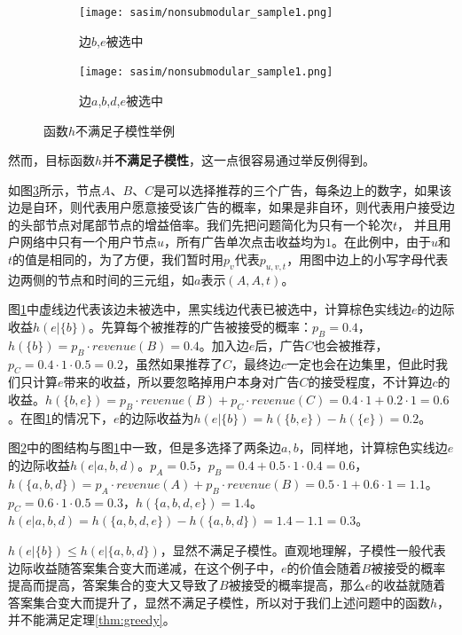 \begin{figure}[htbp]
    \centering
    \begin{subfigure}[t]{0.44\linewidth}
        \centering
        \texttt{[image: sasim/nonsubmodular\_sample1.png]}
        \caption{边$b$,$e$被选中\label{fig:nonsub_a}}
    \end{subfigure}
    \quad
    \begin{subfigure}[t]{0.44\linewidth}
        \centering
        \texttt{[image: sasim/nonsubmodular\_sample1.png]}
        \caption{边$a$,$b$,$d$,$e$被选中\label{fig:nonsub_b}}
    \end{subfigure}

    \caption{\label{fig:nonsub_sample}函数$h$不满足子模性举例}
\end{figure}


然而，目标函数$h$并{\bfseries 不满足子模性}，这一点很容易通过举反例得到。

如图\ref{fig:nonsub_sample}所示，节点$A$、$B$、$C$是可以选择推荐的三个广告，每条边上的数字，如果该边是自环，则代表用户愿意接受该广告的概率，如果是非自环，则代表用户接受边的头部节点对尾部节点的增益倍率。我们先把问题简化为只有一个轮次$t$， 并且用户网络中只有一个用户节点$u$，所有广告单次点击收益均为$1$。在此例中，由于$u$和$t$的值是相同的，为了方便，我们暂时用$p_{v}$代表$p_{u,v,t}$，用图中边上的小写字母代表边两侧的节点和时间的三元组，如$a$表示$(A,A,t)$。

图\ref{fig:nonsub_a}中虚线边代表该边未被选中，黑实线边代表已被选中，计算棕色实线边$e$的边际收益$h(e|\{b\})$。先算每个被推荐的广告被接受的概率：$p_B=0.4$，$h(\{b\})=p_B \cdot revenue(B)=0.4$。加入边$e$后，广告$C$也会被推荐，$p_C=0.4 \cdot 1 \cdot 0.5=0.2$，虽然如果推荐了$C$，最终边$c$一定也会在边集里，但此时我们只计算$e$带来的收益，所以要忽略掉用户本身对广告$C$的接受程度，不计算边$c$的收益。$h(\{b,e\})=p_B\cdot revenue(B)+p_C\cdot revenue(C)=0.4\cdot 1+0.2\cdot 1=0.6$。在图\ref{fig:nonsub_a}的情况下，$e$的边际收益为$h(e|\{b\})=h(\{b,e\})-h(\{e\})=0.2$。

图\ref{fig:nonsub_b}中的图结构与图\ref{fig:nonsub_a}中一致，但是多选择了两条边$a,b$，同样地，计算棕色实线边$e$的边际收益$h(e|{a,b,d})$。$p_A=0.5$，$p_B=0.4+0.5\cdot 1\cdot 0.4=0.6$，$h(\{a,b,d\})=p_A\cdot revenue(A)+p_B\cdot revenue(B)=0.5\cdot 1 + 0.6 \cdot 1 = 1.1$。$p_C=0.6 \cdot 1\cdot 0.5 = 0.3$，$h(\{a,b,d,e\})=1.4$。$h(e|{a,b,d})=h(\{a,b,d,e\})-h(\{a,b,d\})=1.4-1.1=0.3$。

$h(e|\{b\})\le h(e|\{a,b,d\})$，显然不满足子模性。直观地理解，子模性一般代表边际收益随答案集合变大而递减，在这个例子中，$e$的价值会随着$B$被接受的概率提高而提高，答案集合的变大又导致了$B$被接受的概率提高，那么$e$的收益就随着答案集合变大而提升了，显然不满足子模性，所以对于我们上述问题中的函数$h$，并不能满足定理\ref{thm:greedy}。

